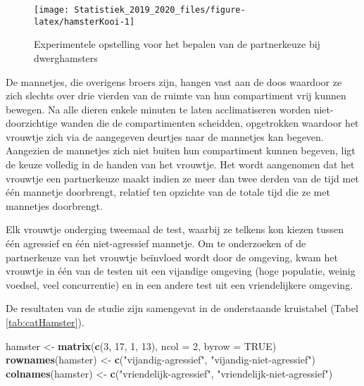 \documentclass[12pt,dutch,coursenotes]{book}
\newenvironment{Shaded}{\begin{snugshade}}{\end{snugshade}}
\newcommand{\KeywordTok}[1]{\textcolor[rgb]{0.13,0.29,0.53}{\textbf{#1}}}
\newcommand{\DataTypeTok}[1]{\textcolor[rgb]{0.13,0.29,0.53}{#1}}
\newcommand{\DecValTok}[1]{\textcolor[rgb]{0.00,0.00,0.81}{#1}}
\newcommand{\StringTok}[1]{\textcolor[rgb]{0.31,0.60,0.02}{#1}}
\newcommand{\OtherTok}[1]{\textcolor[rgb]{0.56,0.35,0.01}{#1}}
\newcommand{\NormalTok}[1]{#1}
\theoremstyle{definition}
\theoremstyle{definition}
\theoremstyle{definition}
\theoremstyle{remark}
\begin{document}
\begin{figure}

{\centering \texttt{[image: Statistiek\_2019\_2020\_files/figure-latex/hamsterKooi-1]} 

}

\caption{Experimentele opstelling voor het bepalen van de partnerkeuze bij dwerghamsters}\label{fig:hamsterKooi}
\end{figure}

De mannetjes, die overigens broers zijn, hangen vast aan de doos
waardoor ze zich slechts over drie vierden van de ruimte van hun
compartiment vrij kunnen bewegen. Na alle dieren enkele minuten te laten
acclimatiseren worden niet-doorzichtige wanden die de compartimenten
scheidden, opgetrokken waardoor het vrouwtje zich via de aangegeven
deurtjes naar de mannetjes kan begeven. Aangezien de mannetjes zich niet
buiten hun compartiment kunnen begeven, ligt de keuze volledig in de
handen van het vrouwtje. Het wordt aangenomen dat het vrouwtje een
partnerkeuze maakt indien ze meer dan twee derden van de tijd met één
mannetje doorbrengt, relatief ten opzichte van de totale tijd die ze met
mannetjes doorbrengt.

Elk vrouwtje onderging tweemaal de test, waarbij ze telkens kon kiezen
tussen één agressief en één niet-agressief mannetje. Om te onderzoeken
of de partnerkeuze van het vrouwtje beïnvloed wordt door de omgeving,
kwam het vrouwtje in één van de testen uit een vijandige omgeving (hoge
populatie, weinig voedsel, veel concurrentie) en in een andere test uit
een vriendelijkere omgeving.

De resultaten van de studie zijn samengevat in de onderstaande
kruistabel (Tabel \ref{tab:catHamster}).

\begin{Shaded}
\begin{Highlighting}[]
\NormalTok{hamster <-}\StringTok{ }\KeywordTok{matrix}\NormalTok{(}\KeywordTok{c}\NormalTok{(}\DecValTok{3}\NormalTok{, }\DecValTok{17}\NormalTok{, }\DecValTok{1}\NormalTok{, }\DecValTok{13}\NormalTok{), }\DataTypeTok{ncol =} \DecValTok{2}\NormalTok{, }\DataTypeTok{byrow =} \OtherTok{TRUE}\NormalTok{)}
\KeywordTok{rownames}\NormalTok{(hamster) <-}\StringTok{ }\KeywordTok{c}\NormalTok{(}\StringTok{"vijandig-agressief"}\NormalTok{, }\StringTok{"vijandig-niet-agressief"}\NormalTok{)}
\KeywordTok{colnames}\NormalTok{(hamster) <-}\StringTok{ }\KeywordTok{c}\NormalTok{(}\StringTok{"vriendelijk-agressief"}\NormalTok{, }\StringTok{"vriendelijk-niet-agressief"}\NormalTok{)}
\end{Highlighting}
\end{Shaded}
\end{document}
